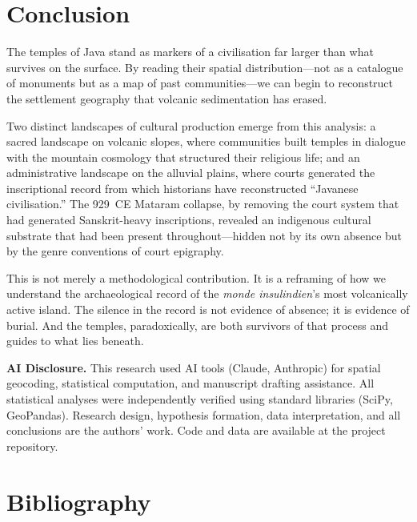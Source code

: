 \documentclass[12pt,a4paper]{article}
\begin{document}
\section{Conclusion}

The temples of Java stand as markers of a civilisation far larger than what survives on the surface.
By reading their spatial distribution---not as a catalogue of monuments but as a map of past communities---we can begin to reconstruct the settlement geography that volcanic sedimentation has erased.

Two distinct landscapes of cultural production emerge from this analysis: a sacred landscape on volcanic slopes, where communities built temples in dialogue with the mountain cosmology that structured their religious life; and an administrative landscape on the alluvial plains, where courts generated the inscriptional record from which historians have reconstructed ``Javanese civilisation.''
The 929~CE Mataram collapse, by removing the court system that had generated Sanskrit-heavy inscriptions, revealed an indigenous cultural substrate that had been present throughout---hidden not by its own absence but by the genre conventions of court epigraphy.

This is not merely a methodological contribution.
It is a reframing of how we understand the archaeological record of the \emph{monde insulindien}'s most volcanically active island.
The silence in the record is not evidence of absence; it is evidence of burial.
And the temples, paradoxically, are both survivors of that process and guides to what lies beneath.

\vspace{1em}
\noindent\textbf{AI Disclosure.} This research used AI tools (Claude, Anthropic) for spatial geocoding, statistical computation, and manuscript drafting assistance. All statistical analyses were independently verified using standard libraries (SciPy, GeoPandas). Research design, hypothesis formation, data interpretation, and all conclusions are the authors' work. Code and data are available at the project repository.


\section*{Bibliography}
\end{document}
